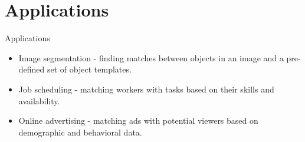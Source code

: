 \documentclass{beamer}
\begin{document}
\section{Applications}
\begin{frame}{Applications}
    \begin{itemize}
        \item<1-> \alert{Image segmentation} - finding matches between objects in an image and a pre-defined set of object templates.
        \item<2-> \alert{Job scheduling} - matching workers with tasks based on their skills and availability.
        \item<3-> \alert{Online advertising} - matching ads with potential viewers based on demographic and behavioral data.
    \end{itemize}
\end{frame}
\end{document}
